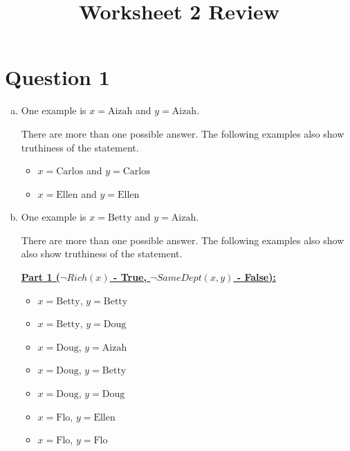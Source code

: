 \documentclass[12pt]{article}
\begin{document}
\title{Worksheet 2 Review}
\maketitle

\section*{Question 1}
\begin{enumerate}[a.]
    \item

    One example is $x = \text{Aizah}$ and $y = \text{Aizah}$.

    \bigskip

    There are more than one possible answer. The following examples also show
    truthiness of the statement.

    \begin{itemize}
        \item $x = \text{Carlos}$ and $y = \text{Carlos}$
        \item $x = \text{Ellen}$ and $y = \text{Ellen}$
    \end{itemize}

    \item

    One example is $x = \text{Betty}$ and $y = \text{Aizah}$.

    \bigskip

    There are more than one possible answer. The following examples also show
    also show truthiness of the statement.

    \bigskip

    \underline{\textbf{Part 1 ($\neg Rich(x)$ - True, $\neg SameDept(x,y)$ - False):}}

    \begin{itemize}
        \item $x = \text{Betty}$, $y = \text{Betty}$
        \item $x = \text{Betty}$, $y = \text{Doug}$
        \item $x = \text{Doug}$, $y = \text{Aizah}$
        \item $x = \text{Doug}$, $y = \text{Betty}$
        \item $x = \text{Doug}$, $y = \text{Doug}$
        \item $x = \text{Flo}$, $y = \text{Ellen}$
        \item $x = \text{Flo}$, $y = \text{Flo}$
    \end{itemize}


\end{enumerate}
\end{document}
